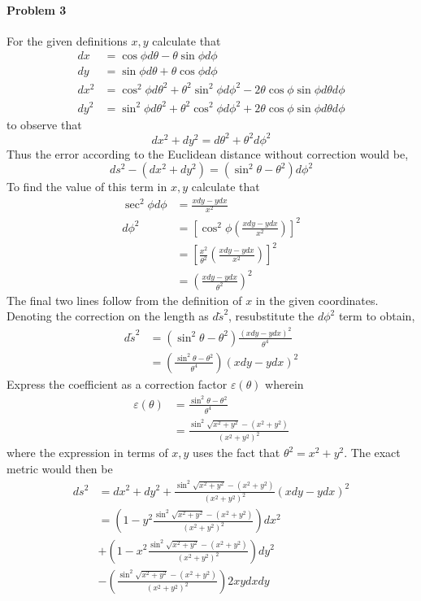 \documentclass[12pt]{scrartcl}
\begin{document}
\paragraph{Problem 3}
For the given definitions $x, y$ calculate that
\begin{align*}
	dx &= \cos\phi d\theta - \theta\sin\phi d\phi \\
	dy &= \sin\phi d\theta + \theta\cos\phi d\phi \\
	dx^2 &= \cos^2{\phi}d\theta^2 + \theta^2 \sin^2\phi d\phi^2 - 2\theta\cos\phi\sin\phi d\theta d\phi \\
	dy^2 &= \sin^2{\phi}d\theta^2 + \theta^2 \cos^2\phi d\phi^2 + 2\theta\cos\phi\sin\phi d\theta d\phi 
\end{align*}
to observe that
\[dx^2 + dy^2 = d\theta^2 + \theta^2 d\phi^2\]
Thus the error according to the Euclidean distance without correction would be,
\[ds^2 - (dx^2 + dy^2) = (\sin^2\theta - \theta^2)d\phi^2 \]
To find the value of this term in $x, y$ calculate that
\begin{align*}
	\sec^2\phi d\phi &= \frac{x dy - y dx}{x^2} \\
	d\phi^2 &= \left[\cos^2\phi \left(\frac{x dy - y dx}{x^2}\right)\right]^2\\
	&= \left[\frac{x^2}{\theta^2}\left(\frac{x dy - y dx}{x^2}\right)\right]^2\\
	&= \left(\frac{x dy - y dx}{\theta^2}\right)^2
\end{align*}
The final two lines follow from the definition of $x$ in the given coordinates. Denoting the correction on the length as $d\tilde{s}^2$, resubstitute the $d\phi^2$ term to obtain,
\begin{align*}
	d\tilde{s}^2 &= (\sin^2\theta - \theta^2)\frac{(x dy - y dx)^2}{\theta^4} \\
	&= \left(\frac{\sin^2{\theta}-\theta^2}{\theta^4}\right)(x dy - y dx)^2
\end{align*}
Express the coefficient as a correction factor $\varepsilon(\theta)$ wherein
\begin{align*}
	\varepsilon(\theta) &= \frac{\sin^2{\theta}-\theta^2}{\theta^4} \\
	&= \frac{\sin^2{\sqrt{x^2+y^2}}-(x^2 + y^2)}{(x^2 + y^2)^2}
\end{align*}
where the expression in terms of $x, y$ uses the fact that $\theta^2 = x^2 + y^2$. The exact metric would then be 
\begin{align*}
	ds^2 &=  dx^2 + dy^2 +\frac{\sin^2{\sqrt{x^2+y^2}}-(x^2 + y^2)}{(x^2 + y^2)^2}(x dy - y dx)^2\\
	&= \left(1 - y^2\frac{\sin^2{\sqrt{x^2+y^2}}-(x^2 + y^2)}{(x^2 + y^2)^2}\right)dx^2 \\&+ \left(1 - x^2\frac{\sin^2{\sqrt{x^2+y^2}}-(x^2 + y^2)}{(x^2 + y^2)^2}\right)dy^2  \\&- \left(\frac{\sin^2{\sqrt{x^2+y^2}}-(x^2 + y^2)}{(x^2 + y^2)^2}\right)2x y dx dy
\end{align*} 
\end{document}

